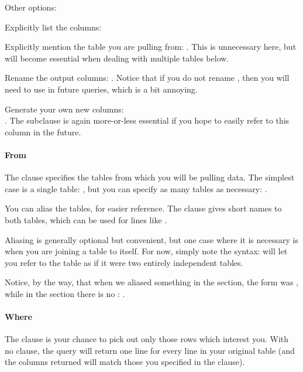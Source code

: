 Other options:

Explicitly list the columns: 

Explicitly mention the table you are pulling from: . This is unnecessary here, but will become
essential when dealing with multiple tables below.

Rename the output columns: . Notice that if you do not rename , then you will need to use  in future
queries, which is a
bit annoying.

Generate your own new columns:\\
.
The  subclause is again more-or-less
essential if you hope to easily refer to this column in the future. 

\paragraph{From} The  clause specifies the tables from which
you will be pulling data. The simplest case is a single table: , but you can specify as many tables as necessary: . 

You can alias the tables, for easier reference. The clause 
 gives short names to both tables, which can
be used for lines like . 

Aliasing is generally optional but convenient, but one case where
it is necessary is when you are joining a table to itself.
For now, simply note the syntax:  will let
you refer to the  table as if it were two entirely independent
tables. 

Notice, by the way, that when we aliased something in the 
section, the form was , while
in the  section there is no : .

\paragraph{Where}
The  clause is your chance to pick out only those rows which
interest you. With no  clause, the query will return one line
for every line in your original table (and the columns returned will
match those you specified in the  clause).

